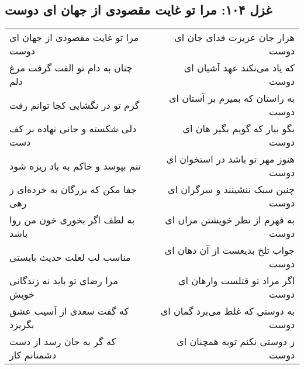 \begin{center}
\section*{غزل ۱۰۴: مرا تو غایت مقصودی از جهان ای دوست}
\label{sec:104}
\begin{longtable}{l p{0.5cm} r}
مرا تو غایت مقصودی از جهان ای دوست
&&
هزار جان عزیزت فدای جان ای دوست
\\
چنان به دام تو الفت گرفت مرغ دلم
&&
که یاد می‌نکند عهد آشیان ای دوست
\\
گرم تو در نگشایی کجا توانم رفت
&&
به راستان که بمیرم بر آستان ای دوست
\\
دلی شکسته و جانی نهاده بر کف دست
&&
بگو بیار که گویم بگیر هان ای دوست
\\
تنم بپوسد و خاکم به باد ریزه شود
&&
هنوز مهر تو باشد در استخوان ای دوست
\\
جفا مکن که بزرگان به خرده‌ای ز رهی
&&
چنین سبک ننشینند و سرگران ای دوست
\\
به لطف اگر بخوری خون من روا باشد
&&
به قهرم از نظر خویشتن مران ای دوست
\\
مناسب لب لعلت حدیث بایستی
&&
جواب تلخ بدیعست از آن دهان ای دوست
\\
مرا رضای تو باید نه زندگانی خویش
&&
اگر مراد تو قتلست وارهان ای دوست
\\
که گفت سعدی از آسیب عشق بگریزد
&&
به دوستی که غلط می‌برد گمان ای دوست
\\
که گر به جان رسد از دست دشمنانم کار
&&
ز دوستی نکنم توبه همچنان ای دوست
\\
\end{longtable}
\end{center}
